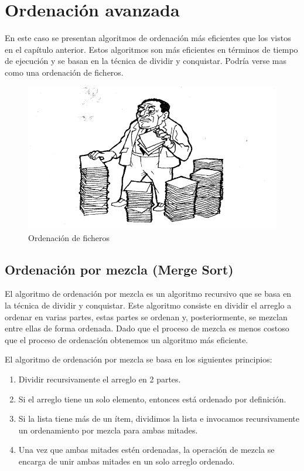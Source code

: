 \chapter{Ordenación avanzada}
En este caso se presentan algoritmos de ordenación más eficientes que los vistos en el capítulo anterior. Estos algoritmos son más eficientes en términos de tiempo de ejecución y se basan en la técnica de dividir y conquistar. Podría verse mas como una ordenación de ficheros.

\begin{figure}[h]
\centering
\includegraphics[scale=0.9]{./estáticos/ordenacionFicheros.png}
\caption{Ordenación de ficheros}
\end{figure}

\section{Ordenación por mezcla (Merge Sort)}
El algoritmo de ordenación por mezcla es un algoritmo recursivo que se basa en la técnica de dividir y conquistar. Este algoritmo consiste en dividir el arreglo a ordenar en varias partes, estas partes se ordenan y, posteriormente, se mezclan entre ellas de forma ordenada. Dado que el proceso de mezcla es menos costoso que el proceso de ordenación obtenemos un algoritmo más eficiente.

El algoritmo de ordenación por mezcla se basa en los siguientes principios:
\begin{enumerate}
    \item Dividir recursivamente el arreglo en 2 partes.
    \item Si el arreglo tiene un solo elemento, entonces está ordenado por definición.
    \item Si la lista tiene más de un ítem, dividimos la lista e invocamos recursivamente un ordenamiento por mezcla para ambas mitades.
    \item Una vez que ambas mitades estén ordenadas, la operación de mezcla se encarga de unir ambas mitades en un solo arreglo ordenado.
\end{enumerate}

